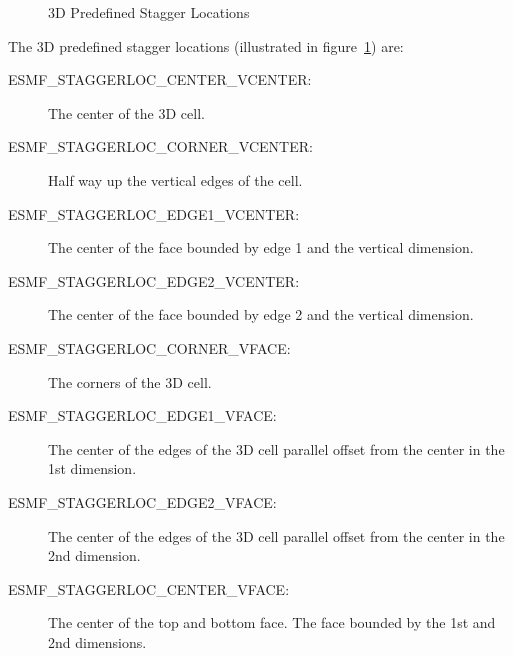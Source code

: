\medskip

\begin{center}
\begin{figure}
\center
{}
\caption{3D Predefined Stagger Locations}
\label{fig:gridstaggerloc3d}
\end{figure}
\end{center}

The 3D predefined stagger locations (illustrated in figure~\ref{fig:gridstaggerloc3d}) are:\\
\begin{description}
\item [ESMF\_STAGGERLOC\_CENTER\_VCENTER:] The center of the 3D cell.
\item [ESMF\_STAGGERLOC\_CORNER\_VCENTER:] Half way up the vertical edges of the cell.
\item [ESMF\_STAGGERLOC\_EDGE1\_VCENTER:] The center of the face bounded by edge 1 and the vertical dimension.
\item [ESMF\_STAGGERLOC\_EDGE2\_VCENTER:] The center of the face bounded by edge 2 and the vertical dimension. 
\item [ESMF\_STAGGERLOC\_CORNER\_VFACE:] The corners of the 3D cell.
\item [ESMF\_STAGGERLOC\_EDGE1\_VFACE:] The center of the edges of the 3D cell parallel offset from the center in the 1st dimension.
\item [ESMF\_STAGGERLOC\_EDGE2\_VFACE:] The center of the edges of the 3D cell parallel offset from the center in the 2nd dimension.
\item [ESMF\_STAGGERLOC\_CENTER\_VFACE:] The center of the top and bottom face. The face bounded by the 1st and 2nd dimensions. 
\end{description}


